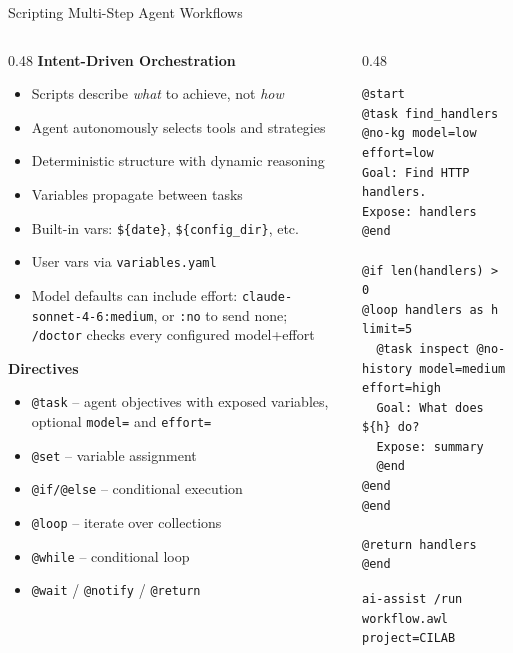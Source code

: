 \documentclass[aspectratio=169,10pt]{beamer}
\begin{document}
\begin{frame}[fragile]{Scripting Multi-Step Agent Workflows}
\begin{columns}[T]
\begin{column}{0.48\textwidth}
\textbf{Intent-Driven Orchestration}
\begin{itemize}\scriptsize\setlength{\itemsep}{1pt}
  \item Scripts describe \emph{what} to achieve, not \emph{how}
  \item Agent autonomously selects tools and strategies
  \item Deterministic structure with dynamic reasoning
  \item Variables propagate between tasks
  \item Built-in vars: \texttt{\$\{date\}}, \texttt{\$\{config\_dir\}}, etc.
  \item User vars via \texttt{variables.yaml}
  \item Model defaults can include effort: \texttt{claude-sonnet-4-6:medium}, or \texttt{:no} to send none; \texttt{/doctor} checks every configured model+effort
\end{itemize}

\smallskip
\textbf{Directives}
\begin{itemize}\scriptsize\setlength{\itemsep}{1pt}
  \item \texttt{@task} -- agent objectives with exposed variables, optional \texttt{model=} and \texttt{effort=}
  \item \texttt{@set} -- variable assignment
  \item \texttt{@if/@else} -- conditional execution
  \item \texttt{@loop} -- iterate over collections
  \item \texttt{@while} -- conditional loop
  \item \texttt{@wait} / \texttt{@notify} / \texttt{@return}
\end{itemize}
\end{column}
\begin{column}{0.48\textwidth}
\begin{lstlisting}[style=code,basicstyle=\ttfamily\fontsize{5.5}{7}\selectfont,language={}]
@start
@task find_handlers @no-kg model=low effort=low
Goal: Find HTTP handlers.
Expose: handlers
@end

@if len(handlers) > 0
@loop handlers as h limit=5
  @task inspect @no-history model=medium effort=high
  Goal: What does ${h} do?
  Expose: summary
  @end
@end
@end

@return handlers
@end
\end{lstlisting}
\vspace{-2mm}
{\scriptsize\texttt{ai-assist /run workflow.awl project=CILAB}}
\end{column}
\end{columns}
\end{frame}
\end{document}
